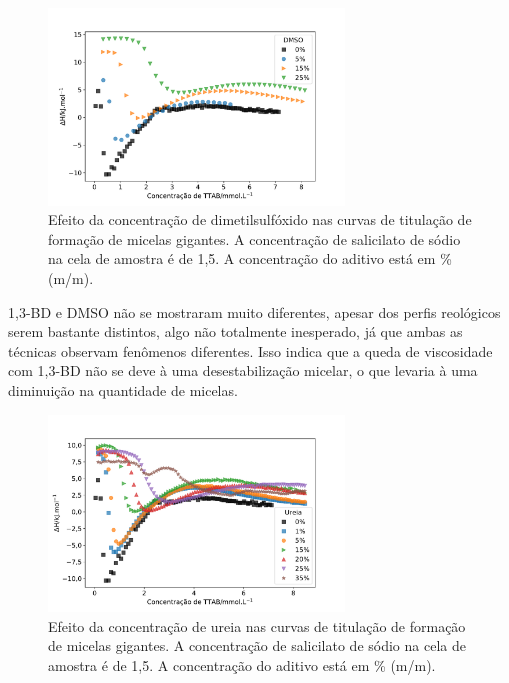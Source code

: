 			\begin{figure}[h]
				\centering
				\includegraphics[width=0.7\textwidth]{imagens/itc/ITC_MG_dmso}
				\caption{Efeito da concentração de dimetilsulfóxido nas curvas de titulação de formação de micelas gigantes. A concentração de salicilato de sódio na cela de amostra é de 1,5\mM. A concentração do aditivo está em \% (m/m).}
				\label{fig:itc_mg_dmso}
			\end{figure}  %

			1,3-BD e DMSO não se mostraram muito diferentes, apesar dos perfis reológicos serem bastante distintos, algo não totalmente inesperado, já que ambas as técnicas observam fenômenos diferentes. Isso indica que a queda de viscosidade com 1,3-BD não se deve à uma desestabilização micelar, o que levaria à uma diminuição na quantidade de micelas.

			\begin{figure}[h]
				\centering
				\includegraphics[width=0.7\textwidth]{imagens/itc/ITC_MG_ur}
				\caption{Efeito da concentração de ureia nas curvas de titulação de formação de micelas gigantes. A concentração de salicilato de sódio na cela de amostra é de 1,5\mM. A concentração do aditivo está em \% (m/m).}
				\label{fig:itc_mg_ureia}
			\end{figure}
		
